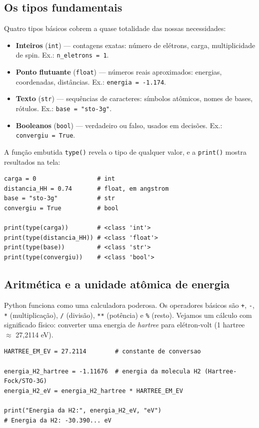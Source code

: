 \documentclass[11pt,a4paper,openany]{book}
\newcommand{\code}[1]{\texttt{#1}}
\newcommand{\python}{\textsf{Python}}
\begin{document}
\subsection{Os tipos fundamentais}

Quatro tipos básicos cobrem a quase totalidade das nossas necessidades:

\begin{itemize}[leftmargin=*]
  \item \textbf{Inteiros} (\code{int}) --- contagens exatas: número de elétrons,
        carga, multiplicidade de spin. Ex.: \code{n\_eletrons = 1}.
  \item \textbf{Ponto flutuante} (\code{float}) --- números reais aproximados:
        energias, coordenadas, distâncias. Ex.: \code{energia = -1.174}.
  \item \textbf{Texto} (\code{str}) --- sequências de caracteres: símbolos
        atômicos, nomes de bases, rótulos. Ex.: \code{base = "sto-3g"}.
  \item \textbf{Booleanos} (\code{bool}) --- verdadeiro ou falso, usados em
        decisões. Ex.: \code{convergiu = True}.
\end{itemize}

A função embutida \code{type()} revela o tipo de qualquer valor, e a \code{print()}
mostra resultados na tela:

\begin{lstlisting}[style=python,caption={Inspecionando tipos com \code{type()}.}]
carga = 0                 # int
distancia_HH = 0.74       # float, em angstrom
base = "sto-3g"           # str
convergiu = True          # bool

print(type(carga))        # <class 'int'>
print(type(distancia_HH)) # <class 'float'>
print(type(base))         # <class 'str'>
print(type(convergiu))    # <class 'bool'>
\end{lstlisting}

\subsection{Aritmética e a unidade atômica de energia}

\python{} funciona como uma calculadora poderosa. Os operadores básicos são
\code{+}, \code{-}, \code{*} (multiplicação), \code{/} (divisão), \code{**} (potência) e
\code{\%} (resto). Vejamos um cálculo com significado físico: converter uma energia
de \emph{hartree} para elétron-volt (1 hartree $\approx$ 27{,}2114 eV).

\begin{lstlisting}[style=python,caption={Conversão de unidades de energia.},label={lst:conversao}]
HARTREE_EM_EV = 27.2114        # constante de conversao

energia_H2_hartree = -1.11676  # energia da molecula H2 (Hartree-Fock/STO-3G)
energia_H2_eV = energia_H2_hartree * HARTREE_EM_EV

print("Energia da H2:", energia_H2_eV, "eV")
# Energia da H2: -30.390... eV
\end{lstlisting}
\end{document}
